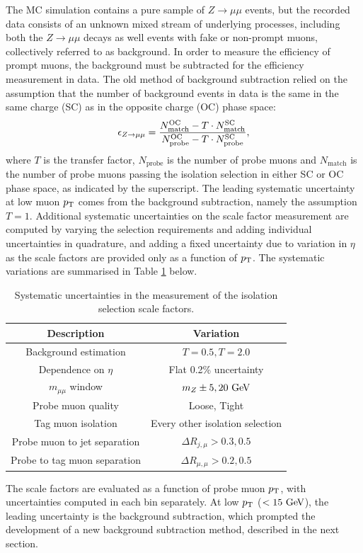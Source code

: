 The MC simulation contains a pure sample of $Z\rightarrow\mu\mu$ events,
but the recorded data consists of an unknown mixed stream of underlying
processes, including both the $Z\rightarrow\mu\mu$ decays as well events with fake
or non-prompt muons, collectively referred to as background. In order
to measure the efficiency of prompt muons, the background must be
subtracted for the efficiency measurement in data. The old method of
background subtraction relied on the assumption that the number of
background events in data is the same in the same charge
(SC) as in the opposite charge (OC) phase space:
\begin{equation}
\epsilon_{Z \rightarrow \mu\mu} =
\frac{N_\text{match}^\text{OC} - T \cdot N_\text{match}^\text{SC}}
     {N_\text{probe}^\text{OC} - T \cdot N_\text{probe}^\text{SC}},
\end{equation}
where $T$ is the transfer factor, $N_\text{probe}$ is the number of
probe muons and $N_\text{match}$ is the number of probe muons passing
the isolation selection in either SC or OC phase space, as indicated by
the superscript. The leading systematic uncertainty at low muon $p_{\text{T}}$
comes from the background subtraction, namely the assumption $T=1$.
Additional systematic uncertainties on the scale factor
measurement are computed by varying the selection requirements and
adding individual uncertainties in quadrature, and adding a fixed
uncertainty due to variation in $\eta$ as the scale factors are
provided only as a function of $p_{\text{T}}$. The systematic variations are
summarised in Table \ref{tab:muon:systs} below.
\begin{table}[h]
\centering
\caption{Systematic uncertainties in the measurement of the isolation
selection scale factors.}
\label{tab:muon:systs}
\begin{tabular}{c c}
\toprule
\midrule
Description & Variation \\
\midrule
Background estimation         & $T=0.5, T=2.0$ \\
Dependence on $\eta$          & Flat 0.2\% uncertainty \\
$m_{\mu\mu}$ window           & $m_Z \pm 5, 20~\text{Ge\kern -0.1em V}$ \\ 
Probe muon quality            & Loose, Tight \\
Tag muon isolation            & Every other isolation selection \\ 
Probe muon to jet separation  & $\Delta R_{j, \mu} > 0.3, 0.5$ \\
Probe to tag muon separation  & $\Delta R_{\mu, \mu} > 0.2, 0.5$ \\
\midrule
\bottomrule
\end{tabular}
\end{table}
The scale factors are evaluated as a function of probe muon $p_{\text{T}}$,
with uncertainties computed in each bin separately. At low $p_{\text{T}}$
($< 15~\text{Ge\kern -0.1em V}$), the leading uncertainty is the background subtraction,
which prompted the development of a new background subtraction
method, described in the next section.

